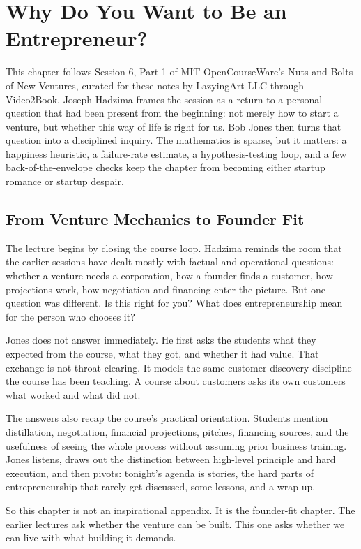 \chapter{Why Do You Want to Be an Entrepreneur?}

This chapter follows Session 6, Part 1 of MIT OpenCourseWare's Nuts and Bolts of New Ventures, curated for these notes by LazyingArt LLC through Video2Book. Joseph Hadzima frames the session as a return to a personal question that had been present from the beginning: not merely how to start a venture, but whether this way of life is right for us. Bob Jones then turns that question into a disciplined inquiry. The mathematics is sparse, but it matters: a happiness heuristic, a failure-rate estimate, a hypothesis-testing loop, and a few back-of-the-envelope checks keep the chapter from becoming either startup romance or startup despair.

\section{From Venture Mechanics to Founder Fit}

The lecture begins by closing the course loop. Hadzima reminds the room that the earlier sessions have dealt mostly with factual and operational questions: whether a venture needs a corporation, how a founder finds a customer, how projections work, how negotiation and financing enter the picture. But one question was different. Is this right for you? What does entrepreneurship mean for the person who chooses it?

Jones does not answer immediately. He first asks the students what they expected from the course, what they got, and whether it had value. That exchange is not throat-clearing. It models the same customer-discovery discipline the course has been teaching. A course about customers asks its own customers what worked and what did not.

The answers also recap the course's practical orientation. Students mention distillation, negotiation, financial projections, pitches, financing sources, and the usefulness of seeing the whole process without assuming prior business training. Jones listens, draws out the distinction between high-level principle and hard execution, and then pivots: tonight's agenda is stories, the hard parts of entrepreneurship that rarely get discussed, some lessons, and a wrap-up.

So this chapter is not an inspirational appendix. It is the founder-fit chapter. The earlier lectures ask whether the venture can be built. This one asks whether we can live with what building it demands.

